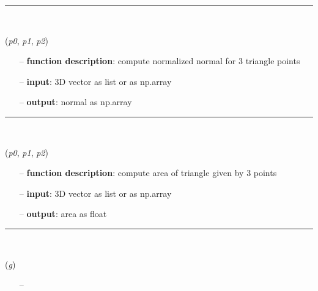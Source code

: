 \begin{itemize}[leftmargin=1.4cm]
\begin{itemize}[leftmargin=1.4cm]
\begin{itemize}[leftmargin=1.4cm]
\begin{itemize}[leftmargin=0.5cm]
\begin{itemize}[leftmargin=1.4cm]
\begin{itemize}[leftmargin=1.4cm]
\begin{itemize}[leftmargin=0.5cm]
\begin{itemize}[leftmargin=1.4cm]
\begin{itemize}[leftmargin=0.5cm]
%
\noindent\rule{8cm}{0.75pt}\vspace{1pt} \\ 
\begin{flushleft}
\label{sec:graphicsDataUtilities:ComputeTriangleNormal}
({\it p0}, {\it p1}, {\it p2})
\end{flushleft}
\setlength{\itemindent}{0.7cm}
\begin{itemize}[leftmargin=0.7cm]
\item[--]
{\bf function description}: compute normalized normal for 3 triangle points
\item[--]
{\bf input}: 3D vector as list or as np.array
\item[--]
{\bf output}: normal as np.array
\vspace{12pt}\end{itemize}
%
\noindent\rule{8cm}{0.75pt}\vspace{1pt} \\ 
\begin{flushleft}
\label{sec:graphicsDataUtilities:ComputeTriangleArea}
({\it p0}, {\it p1}, {\it p2})
\end{flushleft}
\setlength{\itemindent}{0.7cm}
\begin{itemize}[leftmargin=0.7cm]
\item[--]
{\bf function description}: compute area of triangle given by 3 points
\item[--]
{\bf input}: 3D vector as list or as np.array
\item[--]
{\bf output}: area as float
\vspace{12pt}\end{itemize}
%
\noindent\rule{8cm}{0.75pt}\vspace{1pt} \\ 
\begin{flushleft}
\label{sec:graphicsDataUtilities:GraphicsData2PointsAndTrigs}
({\it g})
\end{flushleft}
\setlength{\itemindent}{0.7cm}
\begin{itemize}[leftmargin=0.7cm]
\item[--]

\end{itemize}
\end{itemize}
\end{itemize}
\end{itemize}
\end{itemize}
\end{itemize}
\end{itemize}
\end{itemize}
\end{itemize}
\end{itemize}
